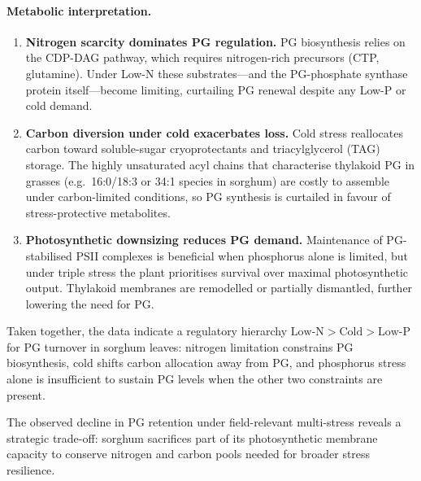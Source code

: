 \documentclass[10pt,letterpaper]{article}
\begin{document}
\paragraph{Metabolic interpretation.}
\begin{enumerate}
  \item \textbf{Nitrogen scarcity dominates PG regulation.}  
        PG biosynthesis relies on the CDP-DAG pathway, which requires
        nitrogen-rich precursors (CTP, glutamine).  Under Low-N these
        substrates---and the PG-phosphate synthase protein itself---become
        limiting, curtailing PG renewal despite any Low-P or cold demand.
  \item \textbf{Carbon diversion under cold exacerbates loss.}  
      Cold stress reallocates carbon toward soluble-sugar cryoprotectants
      and triacylglycerol (TAG) storage.  The highly unsaturated
      acyl chains that characterise thylakoid PG in grasses
      (e.g.\ 16:0/18:3 or 34:1 species in sorghum) are costly to
      assemble under carbon-limited conditions, so PG synthesis is
      curtailed in favour of stress-protective metabolites.
  \item \textbf{Photosynthetic downsizing reduces PG demand.}  
        Maintenance of PG-stabilised PSII complexes is beneficial when
        phosphorus alone is limited, but under triple stress the plant
        prioritises survival over maximal photosynthetic output.
        Thylakoid membranes are remodelled or partially dismantled,
        further lowering the need for PG.
\end{enumerate}

Taken together, the data indicate a regulatory hierarchy \(\text{Low-N} > \text{Cold} > \text{Low-P}\) for PG turnover in sorghum leaves:
nitrogen limitation constrains PG biosynthesis,
cold shifts carbon allocation away from PG, and
phosphorus stress alone is insufficient to sustain PG levels when the
other two constraints are present.

The observed decline in PG retention under field-relevant multi-stress
reveals a strategic trade-off: sorghum sacrifices part of its
photosynthetic membrane capacity to conserve nitrogen and carbon pools
needed for broader stress resilience.
\end{document}
